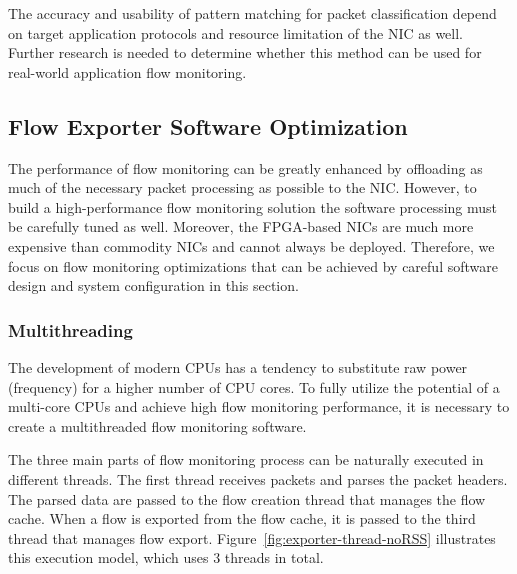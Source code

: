 The accuracy and usability of pattern matching for packet classification depend on target application protocols and resource limitation of the NIC as well. Further research is needed to determine whether this method can be used for real-world application flow monitoring.


\subsection{Flow Exporter Software Optimization}\label{sec:performance-sw-optimization}

The performance of flow monitoring can be greatly enhanced by offloading as much of the necessary packet processing as possible to the NIC. However, to build a high-performance flow monitoring solution the software processing must be carefully tuned as well. Moreover, the FPGA-based NICs are much more expensive than commodity NICs and cannot always be deployed. Therefore, we focus on flow monitoring optimizations that can be achieved by careful software design and system configuration in this section.

\subsubsection{Multithreading}

The development of modern CPUs has a tendency to substitute raw power (frequency) for a higher number of CPU cores. To fully utilize the potential of a multi-core CPUs and achieve high flow monitoring performance, it is necessary to create a multithreaded flow monitoring software.

The three main parts of flow monitoring process can be naturally executed in different threads. The first thread receives packets and parses the packet headers. The parsed data are passed to the flow creation thread that manages the flow cache. When a flow is exported from the flow cache, it is passed to the third thread that manages flow export. Figure~\ref{fig:exporter-thread-noRSS} illustrates this execution model, which uses $3$ threads in total.

